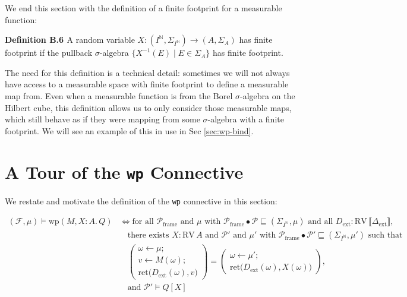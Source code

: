 We end this section with the definition of a finite footprint for a measurable function:

\textbf{Definition B.6 \cite[Appendix B]{lilac}} A random variable $X : (I^\mathbb{N}, \Sigma_{I^\mathbb{N}}) \to (A, \Sigma_A)$ has finite footprint if the pullback $\sigma$-algebra $\{X^{-1}(E) \mid E \in \Sigma_A\}$ has finite footprint.

The need for this definition is a technical detail: sometimes we will not always have access to a measurable space with finite footprint to define a measurable map from. Even when a measurable function
is from the Borel $\sigma$-algebra on the Hilbert cube, this definition allows us to only consider those measurable maps, which still behave as if they were mapping from some $\sigma$-algebra
with a finite footprint. We will see an example of this in use in Sec \ref{sec:wp-bind}.

\section{A Tour of the \texttt{wp} Connective}
\label{sec:wp}
We restate and motivate the definition of the \texttt{wp} connective in this section:

\[
\begin{aligned}
(\mathcal{F},\mu) \vDash \mathrm{wp}(M,X\!:\!A.\,Q) &\iff \text{for all } \mathcal{P}_{\mathrm{frame}} \text{ and } \mu \text{ with } \mathcal{P}_{\mathrm{frame}}\bullet\mathcal{P} \sqsubseteq (\Sigma_{I^\mathbb{N}},\mu) \text{ and all } D_{\mathrm{ext}} : \mathrm{RV}\,\llbracket \Delta_{\mathrm{ext}} \rrbracket, \\
&\quad \text{there exists } X : \mathrm{RV}\,A \text{ and } \mathcal{P}' \text{ and } \mu' \text{ with } \mathcal{P}_{\mathrm{frame}}\bullet\mathcal{P}' \sqsubseteq (\Sigma_{I^\mathbb{N}},\mu') \text{ such that } \\
&\quad \left( \begin{array}{l} \omega \leftarrow \mu;\\ v \leftarrow M(\omega);\\ \mathrm{ret}\bigl(D_{\mathrm{ext}}(\omega),v\bigr) \end{array} \right) = \left( \begin{array}{l} \omega \leftarrow \mu';\\ \mathrm{ret}\bigl(D_{\mathrm{ext}}(\omega),X(\omega)\bigr) \end{array} \right), \\
&\quad \text{and } \mathcal{P}' \vDash Q[X]
\end{aligned}
\]

